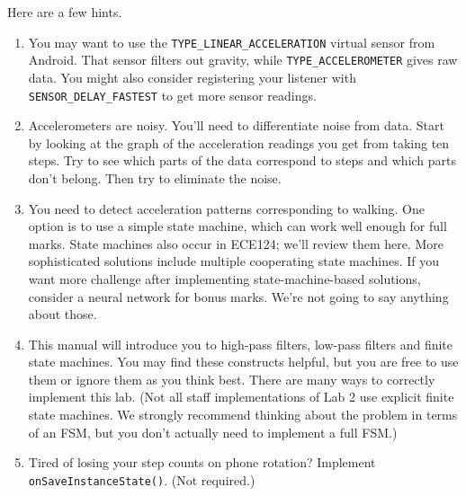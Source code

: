 \documentclass[10pt]{article}
\begin{document}
Here are a few hints.
\begin{enumerate}
\item You may want to use the {\tt TYPE\_LINEAR\_ACCELERATION} virtual sensor from Android. That sensor filters out gravity, while {\tt TYPE\_ACCELEROMETER} gives raw data. You might also consider registering your listener with {\tt SENSOR\_DELAY\_FASTEST} to get more sensor readings.
\item Accelerometers are noisy. You'll need to differentiate noise from data. Start by looking at the graph of the acceleration readings you get from taking ten steps. Try to see which parts of the data correspond to steps and which parts don't belong. Then try to eliminate the noise.
\item You need to detect acceleration patterns corresponding to walking. One option is to use a simple state machine, which can work well enough for full marks. State machines also occur in ECE124; we'll review them here. More sophisticated solutions include multiple cooperating state machines. If you want more challenge after implementing state-machine-based solutions, consider a neural network for bonus marks. We're not going to say anything about those.
\item This manual will introduce you to high-pass filters, low-pass filters and finite state machines. You may find these constructs helpful, but you are free to use them or ignore them as you think best. There are many ways to correctly implement this lab. (Not all staff implementations of Lab 2 use explicit finite state machines. We strongly recommend thinking about the problem in terms of an FSM, but you don't actually need to implement a full FSM.)
\item Tired of losing your step counts on phone rotation? Implement {\tt onSaveInstanceState()}. (Not required.)

\end{enumerate}
\end{document}
